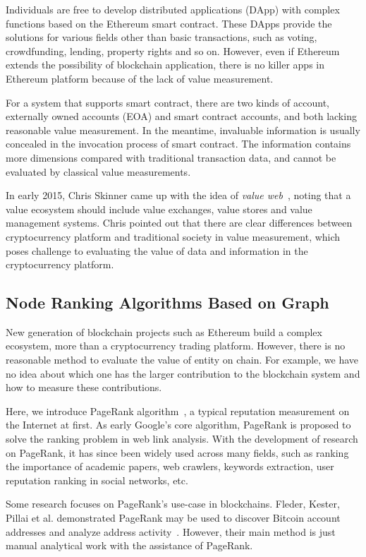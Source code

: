 Individuals are free to develop distributed applications (DApp) with complex functions based on the Ethereum smart contract. These DApps provide the solutions for various fields other than basic transactions, such as voting, crowdfunding, lending, property rights and so on.
However, even if Ethereum extends the possibility of blockchain application, there is no killer apps in Ethereum platform because of the lack of value measurement.

For a system that supports smart contract, there are two kinds of account, externally owned accounts (EOA) and smart contract accounts, and both lacking reasonable value measurement. In the meantime, invaluable information is usually concealed in the invocation process of smart contract. The information contains more dimensions compared with traditional transaction data, and cannot be evaluated by classical value measurements.

In early 2015, Chris Skinner came up with the idea of \emph{value web}~\cite{ChrisSkinner}, noting that a value ecosystem should include value exchanges, value stores and value management systems. Chris pointed out that there are clear differences between cryptocurrency platform and traditional society in value measurement, which poses challenge to evaluating the value of data and information in the cryptocurrency platform.

\subsection{Node Ranking Algorithms Based on Graph}
New generation of blockchain projects such as Ethereum build a complex ecosystem, more than a cryptocurrency trading platform. However, there is no reasonable method to evaluate the value of entity on chain. For example, we have no idea about which one has the larger contribution to the blockchain system and how to measure these contributions.

Here, we introduce PageRank algorithm~\cite{page1999pagerank}, a typical reputation measurement on the Internet at first. As early Google's core algorithm, PageRank is proposed to solve the ranking problem in web link analysis. With the development of research on PageRank, it has since been widely used across many fields, such as ranking the importance of academic papers, web crawlers, keywords extraction, user reputation ranking in social networks, etc.


Some research focuses on PageRank's use-case in blockchains. Fleder, Kester, Pillai et al. demonstrated PageRank may be used to discover Bitcoin account addresses and analyze address activity~\cite{Fleder2015}. However, their main method is just manual analytical work with the assistance of PageRank.

